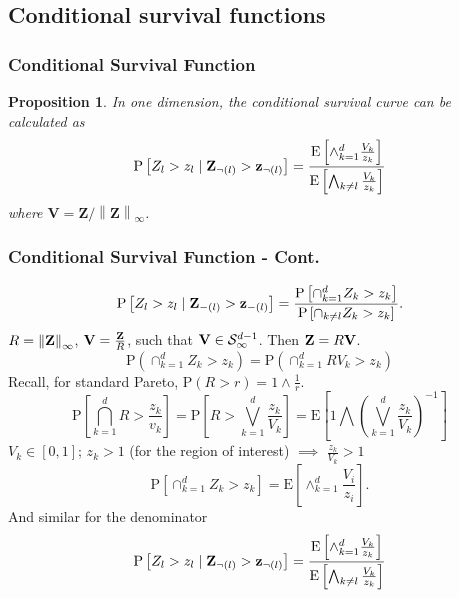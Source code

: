 \documentclass[aspectratio=169]{beamer}
\newcommand{\norm}[1]{\left\lVert #1 \right\rVert}
\newcommand{\pnorm}[2]{\norm{#1}_{#2}}
\newtheorem{prop}{Proposition}
\begin{document}
\subsection{Conditional survival functions}

\begin{frame}
  \frametitle{Conditional Survival Function}
  \begin{prop}
      In one dimension, the conditional survival curve can be calculated as
   \begin{equation*}
      \label{eqn:condsurv1df}
      \text{P}\left[Z_l > z_l\mid {\bf Z}_{\neg(l)} > {\bf z}_{\neg(l)}\right] =
        \frac{\text{E}\left[\wedge_{k = 1}^d \frac{V_k}{z_k}\right]}{
                      \text{E}\left[\bigwedge_{k \neq l}\frac{V_k}{z_k}\right]}
    \end{equation*}
      where $\bm{V} = \bm{Z} / \pnorm{\bm{Z}}{\infty}$.
  \end{prop}
\end{frame}

\begin{frame}
  \frametitle{Conditional Survival Function - Cont.}
  \begin{footnotesize}
  \begin{equation*}
    \label{eqn:condsurv1d}
    \text{P}\left[Z_l > z_l\mid {\bf Z}_{-(l)} > {\bf z}_{-(l)}\right] =
      \frac{\text{P}\left[\cap_{k = 1}^d Z_k > z_k\right]}{\text{P}\left[\cap_{k \neq l} Z_k > z_k\right]}.
  \end{equation*}
  \pause
  $R = \pnorm{{\bf Z}}{\infty}$, ${\bf V} = \frac{{\bf Z}}{R}$, such that
    ${\bf V}\in \mathcal{S}_{\infty}^{d-1}$.  Then ${\bf Z} = R{\bf V}$.
  \begin{equation*}
    \text{P}\left(\cap_{k = 1}^d Z_k > z_k\right) = \text{P}\left(\cap_{k = 1}^d RV_k > z_k\right)
  \end{equation*}
  \pause
  Recall, for standard Pareto, $\text{P}(R > r) = 1\wedge\frac{1}{r}$.
  \begin{equation*}
    \text{P}\left[\bigcap_{k = 1}^d R > \frac{z_k}{v_k}\right] =
      \text{P}\left[R  > \bigvee_{k=1}^d\frac{z_k}{V_k}\right] =
      \text{E}\left[1 \bigwedge \left(\bigvee_{k = 1}^d\frac{z_k}{V_k}\right)^{-1}\right]
  \end{equation*}
  $V_k \in [0,1]$; $z_k > 1$ (for the region of interest) $\implies$ $\frac{z_k}{V_k} > 1$
  \pause
  \begin{equation*}
    \text{P}\left[\cap_{k = 1}^d Z_k > z_k\right] = \text{E}\left[\wedge_{k = 1}^d\frac{V_i}{z_i}\right].
  \end{equation*}
  \pause
  And similar for the denominator
  \begin{equation*}
    \text{P}\left[Z_l > z_l\mid {\bf Z}_{\neg(l)} > {\bf z}_{\neg(l)}\right] =
      \frac{\text{E}\left[\wedge_{k = 1}^d \frac{V_k}{z_k}\right]}{\text{E}\left[
                \bigwedge_{k \neq l}\frac{V_k}{z_k}\right]}
  \end{equation*}
  \end{footnotesize}
\end{frame}
\end{document}
